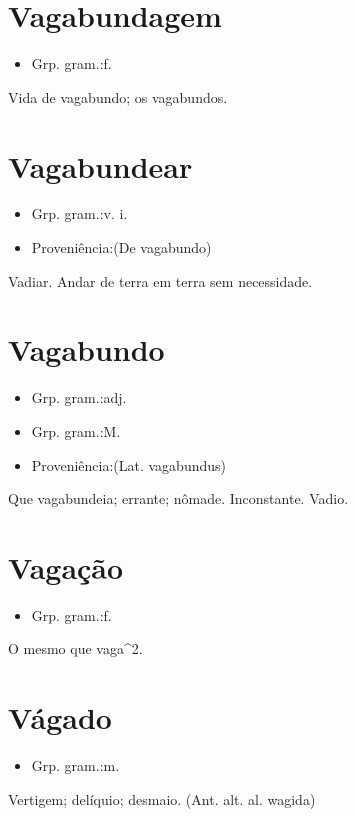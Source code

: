\documentclass{article}
\begin{document}
\section{Vagabundagem}
\begin{itemize}
\item {Grp. gram.:f.}
\end{itemize}
Vida de vagabundo; os vagabundos.
\section{Vagabundear}
\begin{itemize}
\item {Grp. gram.:v. i.}
\end{itemize}
\begin{itemize}
\item {Proveniência:(De \textunderscore vagabundo\textunderscore )}
\end{itemize}
Vadiar.
Andar de terra em terra sem necessidade.
\section{Vagabundo}
\begin{itemize}
\item {Grp. gram.:adj.}
\end{itemize}
\begin{itemize}
\item {Grp. gram.:M.}
\end{itemize}
\begin{itemize}
\item {Proveniência:(Lat. \textunderscore vagabundus\textunderscore )}
\end{itemize}
Que vagabundeia; errante; nômade.
Inconstante.
Vadio.
\section{Vagação}
\begin{itemize}
\item {Grp. gram.:f.}
\end{itemize}
O mesmo que \textunderscore vaga\textunderscore ^2.
\section{Vágado}
\begin{itemize}
\item {Grp. gram.:m.}
\end{itemize}
Vertigem; delíquio; desmaio.
(Ant. alt. al. \textunderscore wagida\textunderscore )
\end{document}
